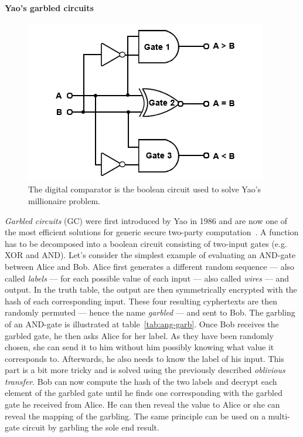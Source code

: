 \paragraph{Yao's garbled circuits}
\begin{figure}
\begin{center}
    \includegraphics[width=.45\textwidth]{parts/chap-3/img-3/yao-comp.jpg}
    \caption[The digital comparator]{The digital comparator is the boolean circuit used to solve Yao's millionaire problem.} 
    \label{privacy:yao-comp}
\end{center}
\end{figure}
\emph{Garbled circuits} (GC) were first introduced by Yao in 1986 and are now one of the most efficient solutions for generic secure two-party computation~\cite{Yao1986HowSecrets}. A function has to be decomposed into a boolean circuit consisting of two-input gates (e.g. XOR and AND). Let's consider the simplest example of evaluating an AND-gate between Alice and Bob. Alice first generates a different random sequence --- also called \emph{labels} --- for each possible value of each input --- also called \emph{wires} --- and output. In the truth table, the output are then symmetrically encrypted with the hash of each corresponding input. These four resulting cyphertexts are then randomly permuted --- hence the name \emph{garbled} --- and sent to Bob. The garbling of an AND-gate is illustrated at table~\ref{tab:ang-garb}. Once Bob receives the garbled gate, he then asks Alice for her label. As they have been randomly chosen, she can send it to him without him possibly knowing what value it corresponds to. Afterwards, he also needs to know the label of his input. This part is a bit more tricky and is solved using the previously described \emph{oblivious transfer}. Bob can now compute the hash of the two labels and decrypt each element of the garbled gate until he finds one corresponding with the garbled gate he received from Alice. He can then reveal the value to Alice or she can reveal the mapping of the garbling. The same principle can be used on a multi-gate circuit by garbling the sole end result.

